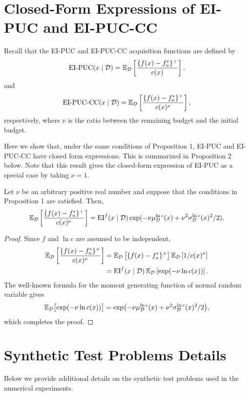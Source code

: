 \section{Closed-Form Expressions of EI-PUC and EI-PUC-CC}
\label{supp:closed_form}
Recall that the EI-PUC and EI-PUC-CC acquisition functions are defined by
\begin{equation*}
    \mathrm{EI\textnormal{-}PUC}(x\mid\mathcal{D}) = \mathbb{E}_{\mathcal{D}}\left[\frac{\{f(x)-f_n^*\}^+}{c(x)}\right],   
\end{equation*}
and
\begin{equation*}
 \mathrm{EI\textnormal{-}PUC\textnormal{-}CC}(x\mid\mathcal{D}) = \mathbb{E}_{\mathcal{D}}\left[\frac{\{f(x)-f_n^*\}^+}{c(x)^\nu}\right],   
\end{equation*}
respectively, where $\nu$ is the ratio between the remaining budget and the initial budget.

Here we show that, under the same conditions of Proposition 1, EI-PUC and EI-PUC-CC have closed form expressions. This is summarized in Proposition 2 below. Note that this result gives the closed-form expression of EI-PUC as a special case by taking $\nu=1$.

\begin{proposition}
\label{prop:eipuc}
Let $\nu$ be an arbitrary positive real number and suppose that the conditions in Proposition 1 are satisfied. Then,
\begin{equation*}
 \mathbb{E}_{\mathcal{D}}\left[\frac{\{f(x)-f_n^*\}^+}{c(x)^\nu}\right]   = \mathrm{EI}^{f}(x\mid \mathcal{D})\exp(-\nu \mu_{\mathcal{D}}^{\ln c}(x) + \nu^2\sigma_{\mathcal{D}}^{\ln c}(x)^2/2),
\end{equation*}
\end{proposition}
\begin{proof}
Since $f$ and $\ln c$ are assumed to be independent,
\begin{align*}
  \mathbb{E}_{\mathcal{D}}\left[\frac{\{f(x)-f_n^*\}^+}{c(x)^\nu}\right]  &=  \mathbb{E}_{\mathcal{D}}\left[\{f(x)-f_n^*\}^+\right]\mathbb{E}_{\mathcal{D}}\left[1/c(x)^\nu\right]\\
  &= \mathrm{EI}^{f}(x\mid\mathcal{D}) \, \mathbb{E}_{\mathcal{D}}\left[\exp(-\nu \ln c(x))\right].
\end{align*}
The well-known formula for the moment generating function of normal random variable gives
\begin{equation*}
  \mathbb{E}_{\mathcal{D}}\bigl[\exp(-\nu \ln c(x))\bigr] = \exp\bigl(-\nu \mu_{\mathcal{D}}^{\ln c}(x) + \nu^2\sigma_{\mathcal{D}}^{\ln c}(x)^2/2 \bigr), 
\end{equation*}
which completes the proof.
\end{proof}


\section{Synthetic Test Problems Details}
\label{supp:synthetic}
Below we provide additional details on the synthetic test problems used in the numerical experiments.
